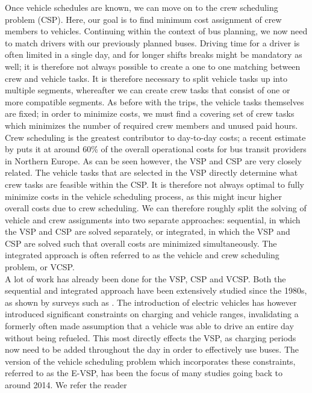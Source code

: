 \documentclass[]{article}
\begin{document}
Once vehicle schedules are known, we can move on to the crew scheduling problem (CSP). Here, our goal is to find minimum cost assignment of crew members to vehicles. Continuing within the context of bus planning, we now need to match drivers with our previously planned buses. Driving time for a driver is often limited in a single day, and for longer shifts breaks might be mandatory as well; it is therefore not always possible to create a one to one matching between crew and vehicle tasks. It is therefore necessary to split vehicle tasks up into multiple segments, whereafter we can create crew tasks that consist of one or more compatible segments. As before with the trips, the vehicle tasks themselves are fixed; in order to minimize costs, we must find a covering set of crew tasks which minimizes the number of required crew members and unused paid hours. \\ 
Crew scheduling is the greatest contributor to day-to-day costs; a recent estimate by \citet{Perumal2019Crew} puts it at around 60\% of the overall operational costs for bus transit providers in Northern Europe. As can be seen however, the VSP and CSP are very closely related. The vehicle tasks that are selected in the VSP directly determine what crew
tasks are feasible within the CSP. It is therefore not always optimal to
fully minimize costs in the vehicle scheduling process, as this might incur
higher overall costs due to crew scheduling. We can therefore roughly split the
solving of vehicle and crew assignments into two separate approaches:
sequential, in which the VSP and CSP are solved separately, or integrated, in
which the VSP and CSP are solved such that overall costs are minimized
simultaneously. The integrated approach is often referred to as the vehicle and
crew scheduling problem, or VCSP. \\
A lot of work has already been done for the VSP, CSP and VCSP.
Both the sequential and integrated approach have been extensively studied since the 1980s, as shown by surveys such as \citet{Bodin1983}. The introduction of electric vehicles has however introduced significant constraints on charging and vehicle ranges, invalidating a formerly often made assumption that a vehicle was able to drive an entire day without being refueled. This most directly effects the VSP, as charging periods now need to be added throughout the day in order to
effectively use buses. The version of the vehicle scheduling problem which incorporates these constraints, referred to as the
E-VSP, has been the focus of many studies going back to around 2014. We refer the reader
\end{document}
